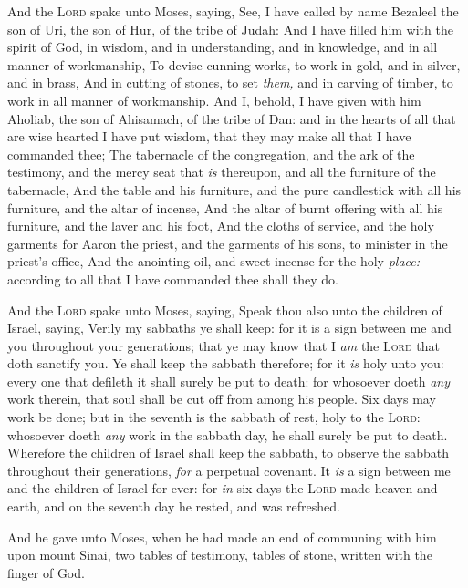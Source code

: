 \documentclass[11pt,letterpaper,oneside]{memoir}
\begin{document}
And the \textsc{Lord} spake unto Moses, saying, See, I have called by
name Bezaleel the son of Uri, the son of Hur, of the tribe of Judah: And
I have filled him with the spirit of God, in wisdom, and in
understanding, and in knowledge, and in all manner of workmanship, To
devise cunning works, to work in gold, and in silver, and in brass, And
in cutting of stones, to set \emph{them,} and in carving of timber, to
work in all manner of workmanship. And I, behold, I have given with him
Aholiab, the son of Ahisamach, of the tribe of Dan: and in the hearts of
all that are wise hearted I have put wisdom, that they may make all that
I have commanded thee; The tabernacle of the congregation, and the ark
of the testimony, and the mercy seat that \emph{is} thereupon, and all
the furniture of the tabernacle, And the table and his furniture, and
the pure candlestick with all his furniture, and the altar of incense,
And the altar of burnt offering with all his furniture, and the laver
and his foot, And the cloths of service, and the holy garments for Aaron
the priest, and the garments of his sons, to minister in the priest's
office, And the anointing oil, and sweet incense for the holy
\emph{place:} according to all that I have commanded thee shall they do.

And the \textsc{Lord} spake unto Moses, saying, Speak thou also unto the
children of Israel, saying, Verily my sabbaths ye shall keep: for it is
a sign between me and you throughout your generations; that ye may know
that I \emph{am} the \textsc{Lord} that doth sanctify you. Ye shall keep
the sabbath therefore; for it \emph{is} holy unto you: every one that
defileth it shall surely be put to death: for whosoever doeth \emph{any}
work therein, that soul shall be cut off from among his people. Six days
may work be done; but in the seventh is the sabbath of rest, holy to the
\textsc{Lord}: whosoever doeth \emph{any} work in the sabbath day, he
shall surely be put to death. Wherefore the children of Israel shall
keep the sabbath, to observe the sabbath throughout their generations,
\emph{for} a perpetual covenant. It \emph{is} a sign between me and the
children of Israel for ever: for \emph{in} six days the \textsc{Lord}
made heaven and earth, and on the seventh day he rested, and was
refreshed.

And he gave unto Moses, when he had made an end of communing with him
upon mount Sinai, two tables of testimony, tables of stone, written with
the finger of God.
\end{document}
